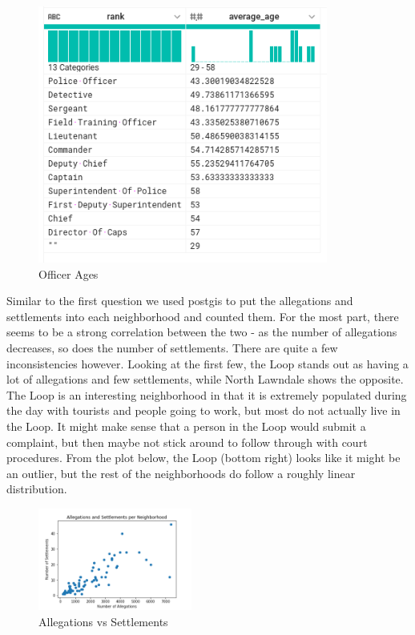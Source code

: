 \documentclass[11pt]{article}
\begin{document}
\begin{figure}[h!]
\centering
\caption{Officer Ages}
\includegraphics[width=0.85\textwidth]{ages.png}
\end{figure}

Similar to the first question we used postgis to put the allegations and settlements into each neighborhood and counted them. For the most part, there seems to be a strong correlation between the two - as the number of allegations decreases, so does the number of settlements. There are quite a few inconsistencies however. Looking at the first few, the Loop stands out as having a lot of allegations and few settlements, while North Lawndale shows the opposite. The Loop is an interesting neighborhood in that it is extremely populated during the day with tourists and people going to work, but most do not actually live in the Loop. It might make sense that a person in the Loop would submit a complaint, but then maybe not stick around to follow through with court procedures. From the plot below, the Loop (bottom right) looks like it might be an outlier, but the rest of the neighborhoods do follow a roughly linear distribution.

\begin{figure}[h!]
\centering
\caption{Allegations vs Settlements}
\includegraphics[width=0.45\textwidth]{alleg_scatter.png}
\end{figure}
\end{document}

